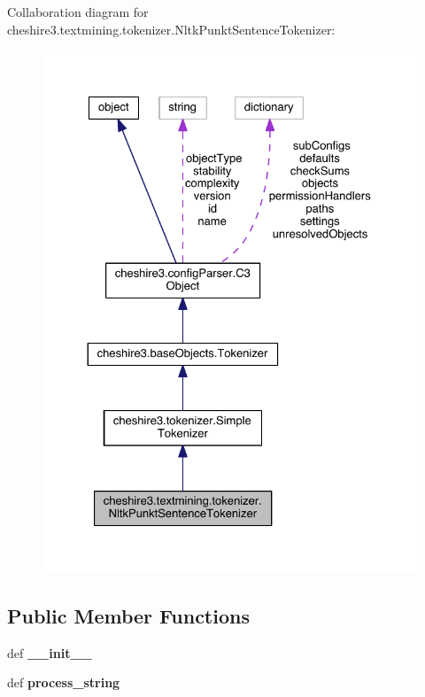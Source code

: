 Collaboration diagram for cheshire3.\-textmining.\-tokenizer.\-Nltk\-Punkt\-Sentence\-Tokenizer\-:
\nopagebreak
\begin{figure}[H]
\begin{center}
\leavevmode
\includegraphics[width=326pt]{classcheshire3_1_1textmining_1_1tokenizer_1_1_nltk_punkt_sentence_tokenizer__coll__graph}
\end{center}
\end{figure}
\subsection*{Public Member Functions}
\begin{DoxyCompactItemize}
\item 
\hypertarget{classcheshire3_1_1textmining_1_1tokenizer_1_1_nltk_punkt_sentence_tokenizer_aebac270f676194aa601fba4374de3d09}{def {\bfseries \-\_\-\-\_\-init\-\_\-\-\_\-}}\label{classcheshire3_1_1textmining_1_1tokenizer_1_1_nltk_punkt_sentence_tokenizer_aebac270f676194aa601fba4374de3d09}

\item 
\hypertarget{classcheshire3_1_1textmining_1_1tokenizer_1_1_nltk_punkt_sentence_tokenizer_a1f73b9b4ba6e24f432aca5dc28075b7d}{def {\bfseries process\-\_\-string}}\label{classcheshire3_1_1textmining_1_1tokenizer_1_1_nltk_punkt_sentence_tokenizer_a1f73b9b4ba6e24f432aca5dc28075b7d}

\end{DoxyCompactItemize}

